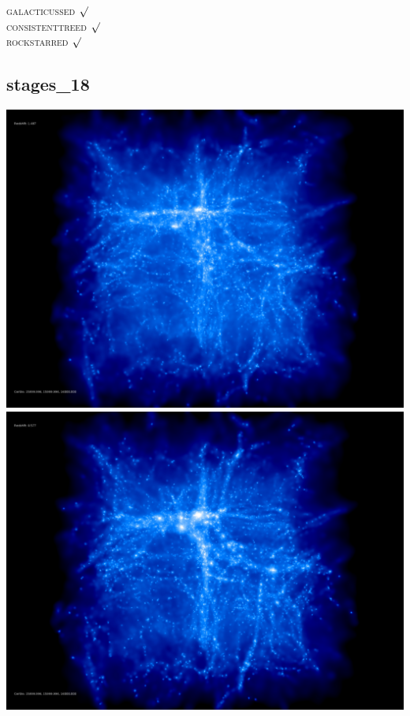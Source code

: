 \textsc{galacticussed} $\surd$ \\
\textsc{consistenttreed} $\surd$ \\ 
\textsc{rockstarred} $\surd$
% 
%
%
%
%
%
%
%


\newpage
\subsection{stages\_18}

\includegraphics[scale=0.1]{stages_18/50.jpg} 
\includegraphics[scale=0.1]{stages_18/100.jpg}  \\

